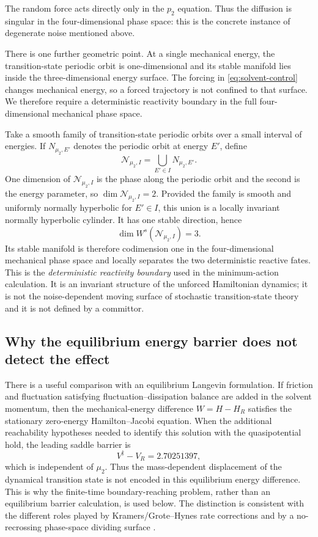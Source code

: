 \documentclass[11pt]{article}
\theoremstyle{definition}
\theoremstyle{remark}
\begin{document}
The random force acts directly only in the $p_2$ equation.  Thus the diffusion is singular in the four-dimensional phase space: this is the concrete instance of degenerate noise mentioned above.

There is one further geometric point.  At a single mechanical energy, the transition-state periodic orbit is one-dimensional and its stable manifold lies inside the three-dimensional energy surface.  The forcing in \eqref{eq:solvent-control} changes mechanical energy, so a forced trajectory is not confined to that surface.  We therefore require a deterministic reactivity boundary in the full four-dimensional mechanical phase space.

Take a smooth family of transition-state periodic orbits over a small interval of energies.  If $N_{\mu_2,E'}$ denotes the periodic orbit at energy $E'$, define
\begin{equation}
\mathcal N_{\mu_2,I}
=
\bigcup_{E'\in I}N_{\mu_2,E'}.
\label{eq:energy-cylinder}
\end{equation}
One dimension of $\mathcal N_{\mu_2,I}$ is the phase along the periodic orbit and the second is the energy parameter, so $\dim\mathcal N_{\mu_2,I}=2$.  Provided the family is smooth and uniformly normally hyperbolic for $E'\in I$, this union is a locally invariant normally hyperbolic cylinder.  It has one stable direction, hence
\[
\dim W^s(\mathcal N_{\mu_2,I})=3.
\]
Its stable manifold is therefore codimension one in the four-dimensional mechanical phase space and locally separates the two deterministic reactive fates.  This is the \emph{deterministic reactivity boundary} used in the minimum-action calculation.  It is an invariant structure of the unforced Hamiltonian dynamics; it is not the noise-dependent moving surface of stochastic transition-state theory and it is not defined by a committor.

\subsection{Why the equilibrium energy barrier does not detect the effect}

There is a useful comparison with an equilibrium Langevin formulation.  If friction and fluctuation satisfying fluctuation--dissipation balance are added in the solvent momentum, then the mechanical-energy difference $W=H-H_R$ satisfies the stationary zero-energy Hamilton--Jacobi equation.  When the additional reachability hypotheses needed to identify this solution with the quasipotential hold, the leading saddle barrier is
\begin{equation}
V^\ddagger-V_R=2.70251397,
\end{equation}
which is independent of $\mu_2$.  Thus the mass-dependent displacement of the dynamical transition state is not encoded in this equilibrium energy difference.  This is why the finite-time boundary-reaching problem, rather than an equilibrium barrier calculation, is used below.  The distinction is consistent with the different roles played by Kramers/Grote--Hynes rate corrections and by a no-recrossing phase-space dividing surface \cite{Kramers1940,GroteHynes1980,GarciaMeseguerCarpenter2019}.
\end{document}
